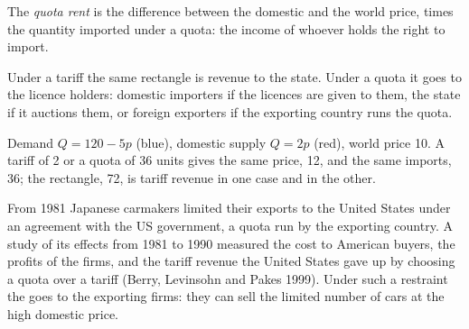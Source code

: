 \begin{definition}\label{def:b1:price-theory-at-work:quota-rent}
The \emph{quota rent} is the difference between the domestic and the
world price, times the quantity imported under a quota: the income of
whoever holds the right to import.
\end{definition}

Under a tariff the same rectangle is revenue to the state. Under a quota
it goes to the licence holders: domestic importers if the licences are
given to them, the state if it auctions them, or foreign exporters if the
exporting country runs the quota.

\begin{omfigure}

{\small Demand $Q = 120 - 5p$ (blue), domestic supply $Q = 2p$ (red), world price 10.
A tariff of 2 or a quota of 36 units gives the same price, 12, and the same
imports, 36; the rectangle, 72, is tariff revenue in one case and  in the other.}
\end{omfigure}

\begin{record}
From 1981 Japanese carmakers limited their exports to the United States
under an agreement with the US government, a quota run by the exporting
country. A study of its effects from 1981 to 1990 measured the cost to
American buyers, the profits of the firms, and the tariff revenue the
United States gave up by choosing a quota over a tariff (Berry,
Levinsohn and Pakes 1999). %
Under such a restraint the  goes to the exporting firms: they
can sell the limited number of cars at the high domestic price.
\end{record}

